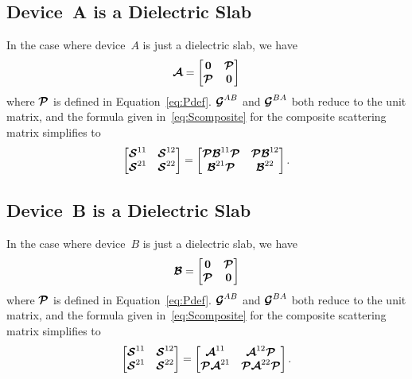 \subsection{Device~A is a Dielectric Slab}
In the case where device~$A$ is just a dielectric slab, we have
\begin{equation}
  \boldsymbol{\mathcal{A}} = 
  \begin{bmatrix}
    \boldsymbol{0} & \boldsymbol{\mathcal{P}} \\
    \boldsymbol{\mathcal{P}} & \boldsymbol{0}
  \end{bmatrix}
\end{equation}
where $\boldsymbol{\mathcal{P}}$ is defined in Equation~\eqref{eq:Pdef}.
$\boldsymbol{\mathcal{G}}^{AB}$ and $\boldsymbol{\mathcal{G}}^{BA}$ both reduce to the unit matrix, and
the formula given in~\eqref{eq:Scomposite}
 for the composite scattering matrix simplifies to 
\begin{equation}
  \begin{bmatrix}
    \boldsymbol{\mathcal{S}}^{11} & \boldsymbol{\mathcal{S}}^{12} \\
    \boldsymbol{\mathcal{S}}^{21} & \boldsymbol{\mathcal{S}}^{22}
  \end{bmatrix}
  =
  \begin{bmatrix}
    \boldsymbol{\mathcal{P}} \boldsymbol{\mathcal{B}}^{11} \boldsymbol{\mathcal{P}} & \boldsymbol{\mathcal{P}} \boldsymbol{\mathcal{B}}^{12} \\
    \boldsymbol{\mathcal{B}}^{21} \boldsymbol{\mathcal{P}} & \boldsymbol{\mathcal{B}}^{22} 
  \end{bmatrix}.
\end{equation}

\subsection{Device~B is a Dielectric Slab}
In the case where device~$B$ is just a dielectric slab, we have
\begin{equation}
  \boldsymbol{\mathcal{B}} = 
  \begin{bmatrix}
    \boldsymbol{0} & \boldsymbol{\mathcal{P}} \\
    \boldsymbol{\mathcal{P}} & \boldsymbol{0}
  \end{bmatrix}
\end{equation}
where $\boldsymbol{\mathcal{P}}$ is defined in Equation~\eqref{eq:Pdef}.
$\boldsymbol{\mathcal{G}}^{AB}$ and $\boldsymbol{\mathcal{G}}^{BA}$ both reduce to the unit matrix, and
the formula given in~\eqref{eq:Scomposite}
for the composite scattering matrix simplifies to 
\begin{equation}
  \begin{bmatrix}
    \boldsymbol{\mathcal{S}}^{11} & \boldsymbol{\mathcal{S}}^{12} \\
    \boldsymbol{\mathcal{S}}^{21} & \boldsymbol{\mathcal{S}}^{22}
  \end{bmatrix}
  =
  \begin{bmatrix}
    \boldsymbol{\mathcal{A}}^{11}  & \boldsymbol{\mathcal{A}}^{12} \boldsymbol{\mathcal{P}} \\
     \boldsymbol{\mathcal{P}} \boldsymbol{\mathcal{A}}^{21} &  \boldsymbol{\mathcal{P}} \boldsymbol{\mathcal{A}}^{22} \boldsymbol{\mathcal{P}} 
  \end{bmatrix}.
\end{equation}

